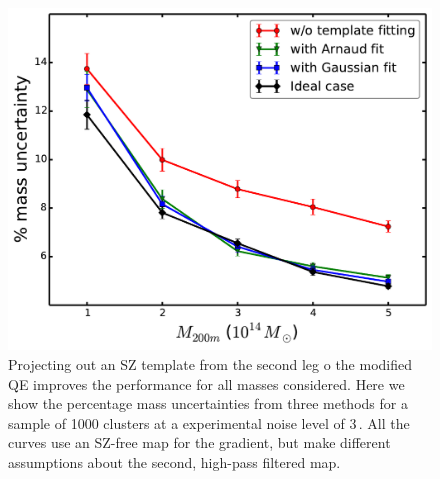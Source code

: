  \begin{figure}[thb]
\includegraphics[width=\linewidth, keepaspectratio]{figs/uncen_vs_mass.pdf}
 \caption{
 Projecting out an SZ template from the second leg o the modified QE improves the performance for all masses considered. 
 Here we show the percentage mass uncertainties from three methods for a sample of 1000 clusters at a experimental noise level of 3\,\ukarcmin{}.
 All the curves use an SZ-free map for the gradient, but make different assumptions about the second, high-pass filtered map. 
\label{fig:template_fitting}}
\end{figure}

